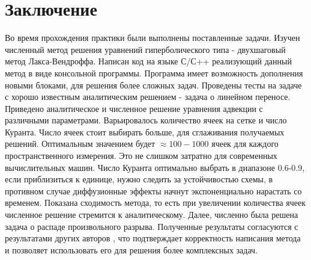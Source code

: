 \documentclass[a4paper]{article}
\begin{document}
	\section{Заключение}
	Во время прохождения практики были выполнены поставленные задачи. Изучен численный метод решения уравнений гиперболического типа - двухшаговый метод Лакса-Вендроффа. Написан код на языке С/С++ реализующий данный метод в виде консольной программы. Программа имеет возможность дополнения новыми блоками, для решения более сложных задач. 
	Проведены тесты на задаче с хорошо известным аналитическим решением - задача о линейном переносе. Приведено аналитическое и численное решение уравнения адвекции с различными параметрами. Варьировалось количество ячеек на сетке и число Куранта. Число ячеек стоит выбирать больше, для сглаживания получаемых решений. Оптимальным значением будет $\approx 100 - 1000$ ячеек для каждого пространственного измерения. Это не слишком затратно для современных вычислительных машин. 
	Число Куранта оптимально выбрать в диапазоне 0.6-0.9, если приблизиться к единице, нужно следить  за устойчивостью схемы, в противном случае диффузионные эффекты начнут экспоненциально нарастать со временем.
	Показана сходимость метода, то есть при увеличении количества ячеек численное решение стремится к аналитическому. Далее, численно была решена задача о распаде произвольного разрыва. Полученные результаты согласуются с результатами других авторов \cite{Bisikalo}, что подтверждает корректность написания метода и позволяет использовать его для решения более комплексных задач.
	
\end{document}
